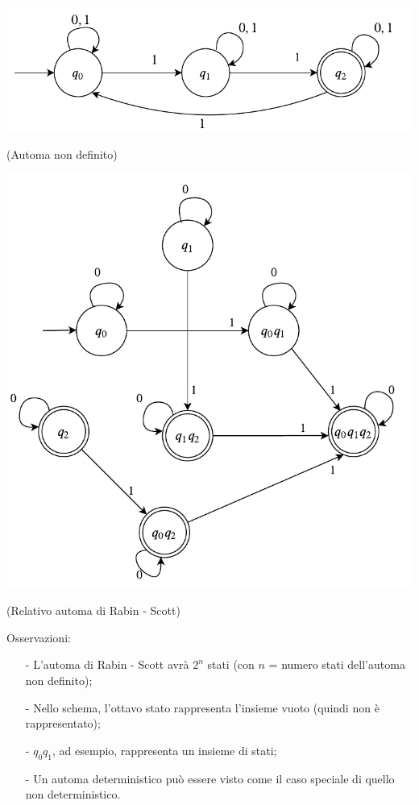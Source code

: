 \documentclass[a4paper, 10pt]{report}
\begin{document}
\begin{center}
\includegraphics[scale=1]{16ottobre04.pdf}

(Automa non definito)

\includegraphics[scale=1]{16ottobre05.pdf}

(Relativo automa di Rabin - Scott)

\end{center}

\noindent Osservazioni:
\begin{itemize}
\item[-] L'automa di Rabin - Scott avrà $2^n$ stati (con $n$ = numero stati dell'automa non definito);
\item[-] Nello schema, l'ottavo stato rappresenta l'insieme vuoto (quindi non è rappresentato);
\item[-] $q_0 q_1$, ad esempio, rappresenta un insieme di stati;
\item[-] Un automa deterministico può essere visto come il caso speciale di quello non deterministico.
\end{itemize}
\end{document}
